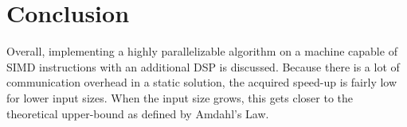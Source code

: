 \section{Conclusion}
Overall, implementing a highly parallelizable algorithm on a machine capable 
of SIMD instructions with an additional DSP is discussed. Because there is a 
lot of communication overhead in a static solution, the acquired speed-up is 
fairly low for lower input sizes. When the input size grows, this gets closer 
to the theoretical upper-bound as defined by Amdahl's Law. 
